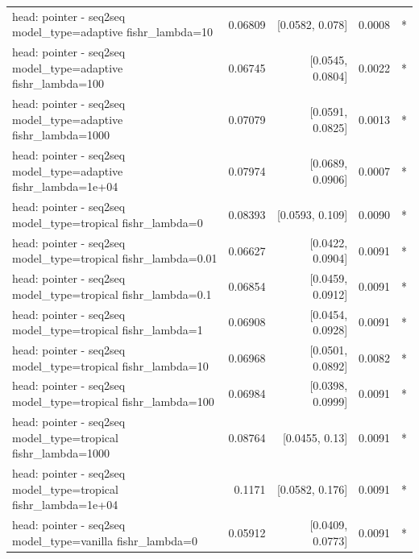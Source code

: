 \documentclass[10pt]{article}
\makeatletter
\newcommand{\stackcell}[1]{\begin{tabular}[t]{@{}l@{}}#1\end{tabular}}
\makeatother
\begin{document}
{\begin{longtable}{lrrrl}
\stackcell{head: pointer - seq2seq\\\footnotesize model\_type=adaptive fishr\_lambda=10 } & 0.06809 & [0.0582, 0.078] & 0.0008 & *\\
\stackcell{head: pointer - seq2seq\\\footnotesize model\_type=adaptive fishr\_lambda=100 } & 0.06745 & [0.0545, 0.0804] & 0.0022 & *\\
\stackcell{head: pointer - seq2seq\\\footnotesize model\_type=adaptive fishr\_lambda=1000 } & 0.07079 & [0.0591, 0.0825] & 0.0013 & *\\
\stackcell{head: pointer - seq2seq\\\footnotesize model\_type=adaptive fishr\_lambda=1e+04 } & 0.07974 & [0.0689, 0.0906] & 0.0007 & *\\
\stackcell{head: pointer - seq2seq\\\footnotesize model\_type=tropical fishr\_lambda=0 } & 0.08393 & [0.0593, 0.109] & 0.0090 & *\\
\stackcell{head: pointer - seq2seq\\\footnotesize model\_type=tropical fishr\_lambda=0.01 } & 0.06627 & [0.0422, 0.0904] & 0.0091 & *\\
\stackcell{head: pointer - seq2seq\\\footnotesize model\_type=tropical fishr\_lambda=0.1 } & 0.06854 & [0.0459, 0.0912] & 0.0091 & *\\
\stackcell{head: pointer - seq2seq\\\footnotesize model\_type=tropical fishr\_lambda=1 } & 0.06908 & [0.0454, 0.0928] & 0.0091 & *\\
\stackcell{head: pointer - seq2seq\\\footnotesize model\_type=tropical fishr\_lambda=10 } & 0.06968 & [0.0501, 0.0892] & 0.0082 & *\\
\stackcell{head: pointer - seq2seq\\\footnotesize model\_type=tropical fishr\_lambda=100 } & 0.06984 & [0.0398, 0.0999] & 0.0091 & *\\
\stackcell{head: pointer - seq2seq\\\footnotesize model\_type=tropical fishr\_lambda=1000 } & 0.08764 & [0.0455, 0.13] & 0.0091 & *\\
\stackcell{head: pointer - seq2seq\\\footnotesize model\_type=tropical fishr\_lambda=1e+04 } & 0.1171 & [0.0582, 0.176] & 0.0091 & *\\
\stackcell{head: pointer - seq2seq\\\footnotesize model\_type=vanilla fishr\_lambda=0 } & 0.05912 & [0.0409, 0.0773] & 0.0091 & *\\

\end{longtable}}
\end{document}

